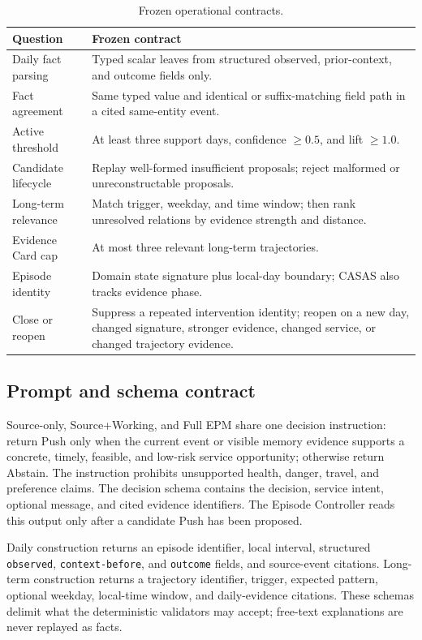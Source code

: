 \documentclass[sigconf,anonymous,review]{acmart}
\newcommand{\system}{EPM}
\begin{document}
\begin{table}[h]
\centering
\caption{Frozen operational contracts.}
\label{tab:operational_contracts}
\small
\begin{tabular}{p{}p{}}
\toprule
Question & Frozen contract \\
\midrule
Daily fact parsing & Typed scalar leaves from structured observed, prior-context, and outcome fields only. \\
Fact agreement & Same typed value and identical or suffix-matching field path in a cited same-entity event. \\
Active threshold & At least three support days, confidence $\geq0.5$, and lift $\geq1.0$. \\
Candidate lifecycle & Replay well-formed insufficient proposals; reject malformed or unreconstructable proposals. \\
Long-term relevance & Match trigger, weekday, and time window; then rank unresolved relations by evidence strength and distance. \\
Evidence Card cap & At most three relevant long-term trajectories. \\
Episode identity & Domain state signature plus local-day boundary; CASAS also tracks evidence phase. \\
Close or reopen & Suppress a repeated intervention identity; reopen on a new day, changed signature, stronger evidence, changed service, or changed trajectory evidence. \\
\bottomrule
\end{tabular}
\end{table}

\subsection{Prompt and schema contract}

Source-only, Source+Working, and Full \system{} share one decision instruction:
return Push only when the current event or visible memory evidence supports a
concrete, timely, feasible, and low-risk service opportunity; otherwise return
Abstain.  The instruction prohibits unsupported health, danger, travel, and
preference claims.  The decision schema contains the decision, service intent,
optional message, and cited evidence identifiers.  The Episode Controller reads
this output only after a candidate Push has been proposed.

Daily construction returns an episode identifier, local interval, structured
\texttt{observed}, \texttt{context-before}, and \texttt{outcome} fields, and
source-event citations.  Long-term construction returns a trajectory
identifier, trigger, expected pattern, optional weekday, local-time window, and
daily-evidence citations.  These schemas delimit what the deterministic
validators may accept; free-text explanations are never replayed as facts.
\end{document}
